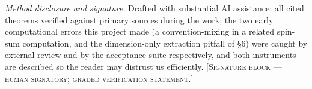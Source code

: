 \documentclass[11pt,reqno]{amsart}
\theoremstyle{plain}
\begin{document}
\bigskip
\noindent\emph{Method disclosure and signature.} Drafted with substantial AI assistance; all cited theorems verified against primary sources during the work; the two early computational errors this project made (a convention-mixing in a related spin-sum computation, and the dimension-only extraction pitfall of \S6) were caught by external review and by the acceptance suite respectively, and both instruments are described so the reader may distrust us efficiently. \textsc{[Signature block --- human signatory; graded verification statement.]}
\end{document}
